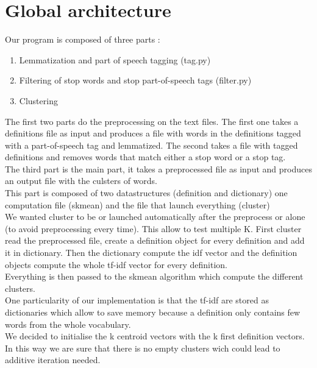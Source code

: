 \documentclass{eplDoc}
\begin{document}
\maketitle
\newpage

\section{Global architecture}

Our program is composed of three parts : 
\begin{enumerate}
	\item Lemmatization and part of speech tagging (tag.py)
	\item Filtering of stop words and stop part-of-speech tags (filter.py)
	\item Clustering  %
\end{enumerate}

The first two parts do the preprocessing on the text files. The first one takes a definitions file as input and produces a file with words in the definitions tagged with a part-of-speech tag and lemmatized. The second takes a file with tagged definitions and removes words that match either a stop word or a stop tag. \\ 

The third part is the main part, it takes a preprocessed file as input and produces an output file with the culsters of words. \\

This part is composed of two datastructures (definition and dictionary) one computation file (skmean) and the file that launch everything (cluster)\\
We wanted cluster to be or launched automatically after the preprocess or alone (to avoid preprocessing every time).  This allow to test multiple K.
First cluster read the preprocessed file, create a definition object for every definition and add it in dictionary.
Then the dictionary compute the idf vector and the definition objects compute the whole tf-idf vector for every definition.
\\
Everything is then passed to the skmean algorithm which compute the different clusters.\\
One particularity of our implementation is that the tf-idf are stored as dictionaries which allow to save memory because a definition only contains few words from the whole vocabulary.
\\
We decided to initialise the k centroid vectors with the k first definition vectors.  In this way we are sure that there is no empty clusters wich could lead to additive iteration needed.
\end{document}
